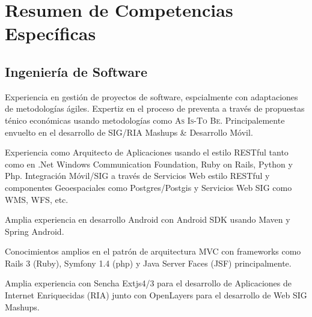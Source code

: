 \documentclass[11pt,letterpaper,roman]{moderncv}
\begin{document}

%	
%	
%	
%
%	
\section{Resumen de Competencias Específicas} \subsection{Ingeniería de
Software}  {Experiencia
en gestión de proyectos de software, espcialmente con adaptaciones de
metodologías ágiles. Expertiz en el proceso de preventa a través de propuestas
ténico económicas usando metodologías como \textsc{As Is-To Be}. Principalemente
envuelto en el desarrollo de SIG/RIA Mashups \& Desarrollo Móvil.}
	

 {Experiencia como Arquitecto de
Aplicaciones usando el estilo RESTful tanto como en .Net Windows Communication
Foundation, Ruby on Rails, Python y Php. Integración Móvil/SIG a través de
Servicios Web estilo RESTful y componentes Geoespaciales como Postgres/Postgis y
Servicios Web SIG como WMS, WFS, etc.}
	

 {Amplia experiencia en desarrollo Android con Android
SDK usando Maven y Spring Android.}

 {Conocimientos amplios en el patrón de arquitectura
MVC con frameworks como Rails 3 (Ruby), Symfony 1.4 (php) y Java Server Faces
(JSF) principalmente.}


 {Amplia experiencia con Sencha Extjs4/3 para el
desarrollo de Aplicaciones de Internet Enriquecidas (RIA) junto con OpenLayers
para el desarrollo de Web SIG Mashups. }
\end{document}

